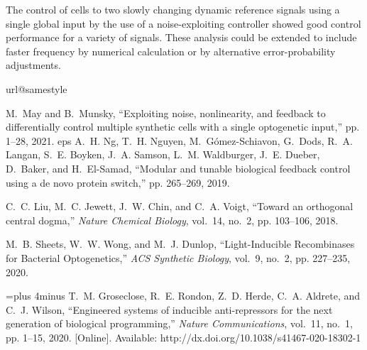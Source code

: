 \documentclass[12pt]{iopart}
\begin{document}
The control of cells to two slowly changing dynamic reference signals using a single global input by the use of a noise-exploiting controller showed good control performance for a variety of signals. These analysis could be extended to include faster frequency by numerical calculation or by alternative error-probability adjustments.


\begin{thebibliography}{10}
\providecommand{\url}[1]{#1}
\csname url@samestyle\endcsname
\providecommand{\newblock}{\relax}
\providecommand{\bibinfo}[2]{#2}
\providecommand{\BIBentrySTDinterwordspacing}{\spaceskip=0pt\relax}
\providecommand{\BIBentryALTinterwordstretchfactor}{4}
\providecommand{\BIBentryALTinterwordspacing}{\spaceskip=\fontdimen2\font plus
\BIBentryALTinterwordstretchfactor\fontdimen3\font minus
  \fontdimen4\font\relax}
\providecommand{\BIBforeignlanguage}[2]{{%
\expandafter\ifx\csname l@#1\endcsname\relax
\typeout{** WARNING: IEEEtran.bst: No hyphenation pattern has been}%
\typeout{** loaded for the language `#1'. Using the pattern for}%
\typeout{** the default language instead.}%
\else
\language=\csname l@#1\endcsname
\fi
#2}}
\providecommand{\BIBdecl}{\relax}
\BIBdecl

M.~May and B.~Munsky, ``{Exploiting noise, nonlinearity, and feedback to
  differentially control multiple synthetic cells with a single optogenetic
  input},'' pp. 1--28, 2021.
eps
A.~H. Ng, T.~H. Nguyen, M.~G{\'{o}}mez-Schiavon, G.~Dods, R.~A. Langan, S.~E.
  Boyken, J.~A. Samson, L.~M. Waldburger, J.~E. Dueber, D.~Baker, and
  H.~El-Samad, ``{Modular and tunable biological feedback control using a de
  novo protein switch},'' pp. 265--269, 2019.

C.~C. Liu, M.~C. Jewett, J.~W. Chin, and C.~A. Voigt, ``{Toward an orthogonal
  central dogma},'' \emph{Nature Chemical Biology}, vol.~14, no.~2, pp.
  103--106, 2018.

M.~B. Sheets, W.~W. Wong, and M.~J. Dunlop, ``{Light-Inducible Recombinases for
  Bacterial Optogenetics},'' \emph{ACS Synthetic Biology}, vol.~9, no.~2, pp.
  227--235, 2020.

\BIBentryALTinterwordspacing
T.~M. Groseclose, R.~E. Rondon, Z.~D. Herde, C.~A. Aldrete, and C.~J. Wilson,
  ``{Engineered systems of inducible anti-repressors for the next generation of
  biological programming},'' \emph{Nature Communications}, vol.~11, no.~1, pp.
  1--15, 2020. [Online]. Available:
  \url{http://dx.doi.org/10.1038/s41467-020-18302-1}
\BIBentrySTDinterwordspacing


\end{thebibliography}
\end{document}
